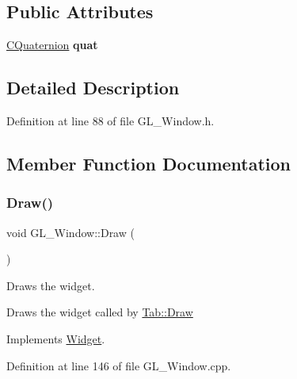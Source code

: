 \subsection*{Public Attributes}
\begin{DoxyCompactItemize}
\item 
\mbox{\label{class_g_l___window_ac2537e874beca24704fddde0f4f89b8f}} 
\hyperlink{class_c_quaternion}{C\+Quaternion} {\bfseries quat}
\end{DoxyCompactItemize}


\subsection{Detailed Description}


Definition at line 88 of file G\+L\+\_\+\+Window.\+h.



\subsection{Member Function Documentation}
\mbox{\label{class_g_l___window_a0065950273a11cddec75d1a4d2cf723e}} 
\subsubsection{\texorpdfstring{Draw()}{Draw()}\hspace{0.1cm}{\footnotesize\ttfamily [1/2]}}
{\footnotesize\ttfamily void G\+L\+\_\+\+Window\+::\+Draw (\begin{DoxyParamCaption}{ }\end{DoxyParamCaption})\hspace{0.3cm}{\ttfamily [virtual]}}



Draws the widget. 

Draws the widget called by \hyperlink{class_tab_ae9db0c3ae8b0b75f7c5b3493b0267482}{Tab\+::\+Draw} 

Implements \hyperlink{class_widget_ac4c2063cd671468ad05d84cfe963c032}{Widget}.



Definition at line 146 of file G\+L\+\_\+\+Window.\+cpp.


